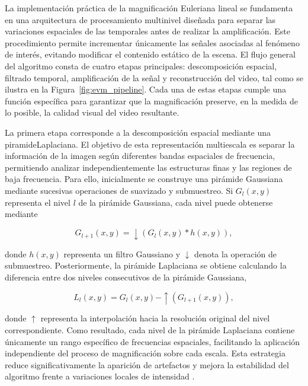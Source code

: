 La implementación práctica de la magnificación Euleriana lineal se fundamenta en una arquitectura de procesamiento multinivel diseñada para separar las variaciones espaciales de las temporales antes de realizar la amplificación. Este procedimiento permite incrementar únicamente las señales asociadas al fenómeno de interés, evitando modificar el contenido estático de la escena. El flujo general del algoritmo consta de cuatro etapas principales: descomposición espacial, filtrado temporal, amplificación de la señal y reconstrucción del video, tal como se ilustra en la Figura~\ref{fig:evm_pipeline}. Cada una de estas etapas cumple una función específica para garantizar que la magnificación preserve, en la medida de lo posible, la calidad visual del video resultante.

La primera etapa corresponde a la descomposición espacial mediante una \gls{piramideLaplaciana}. El objetivo de esta representación multiescala es separar la información de la imagen según diferentes bandas espaciales de frecuencia, permitiendo analizar independientemente las estructuras finas y las regiones de baja frecuencia. Para ello, inicialmente se construye una pirámide Gaussiana mediante sucesivas operaciones de suavizado y submuestreo. Si $G_l(x,y)$ representa el nivel $l$ de la pirámide Gaussiana, cada nivel puede obtenerse mediante

\begin{equation}
G_{l+1}(x,y)=\downarrow\left(G_l(x,y)\ast h(x,y)\right),
\end{equation}

donde $h(x,y)$ representa un filtro Gaussiano y $\downarrow$ denota la operación de submuestreo. Posteriormente, la pirámide Laplaciana se obtiene calculando la diferencia entre dos niveles consecutivos de la pirámide Gaussiana,

\begin{equation}
L_l(x,y)=G_l(x,y)-\uparrow\left(G_{l+1}(x,y)\right),
\end{equation}

donde $\uparrow$ representa la interpolación hacia la resolución original del nivel correspondiente. Como resultado, cada nivel de la pirámide Laplaciana contiene únicamente un rango específico de frecuencias espaciales, facilitando la aplicación independiente del proceso de magnificación sobre cada escala. Esta estrategia reduce significativamente la aparición de artefactos y mejora la estabilidad del algoritmo frente a variaciones locales de intensidad \cite{wu2012eulerian}.


